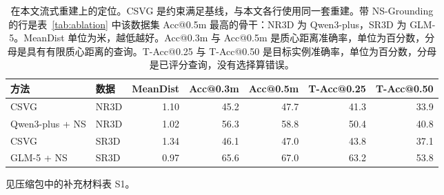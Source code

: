 \documentclass[11pt]{article}
\begin{document}
\begin{CJK*}{UTF8}{gbsn}
\begin{table}[ht]
\centering
\caption{在本文流式重建上的定位。CSVG 是约束满足基线，与本文各行使用同一套重建。带 NS-Grounding 的行是表~\ref{tab:ablation} 中该数据集 Acc@0.5m 最高的骨干：NR3D 为 Qwen3-plus，SR3D 为 GLM-5。MeanDist 单位为米，越低越好。Acc@0.3m 与 Acc@0.5m 是质心距离准确率，单位为百分数，分母是具有有限质心距离的查询。T-Acc@0.25 与 T-Acc@0.50 是目标实例准确率，单位为百分数，分母是已评分查询，没有选择算错误。}
\label{tab:csvg}
\small
\begin{tabular}{llrrrrr}
\toprule
方法 & 数据 & MeanDist & Acc@0.3m & Acc@0.5m & T-Acc@0.25 & T-Acc@0.50 \\
\midrule
CSVG & NR3D & 1.10 & 45.2 & 47.7 & 41.3 & 33.9 \\
Qwen3-plus + NS & NR3D & 1.02 & 56.3 & 58.8 & 50.4 & 40.8 \\
CSVG & SR3D & 1.34 & 46.1 & 47.0 & 43.8 & 37.1 \\
GLM-5 + NS & SR3D & 0.97 & 65.6 & 67.0 & 63.2 & 53.8 \\
\bottomrule
\end{tabular}
\end{table}

\noindent 见压缩包中的补充材料表 S1。

\begin{table}[ht]
\centering
\caption{更正后的定位消融。NS 表示 NS-Grounding；无 NS 时由语言模型直接选择实例。MeanDist、Acc@0.3m 与 Acc@0.5m 的定义同表~\ref{tab:csvg}。T-Acc@0.25 与 T-Acc@0.50 是两个 IoU 阈值下的目标实例准确率。GLM-5 在 SR3D 上、无 NS-Grounding 的一行为 51.9 / 52.5，因此 Acc@0.3m 不高于 Acc@0.5m。各数据集中最高的 Acc@0.5m 分别是 NR3D 上带 NS 的 Qwen3-plus（58.8）和 SR3D 上带 NS 的 GLM-5（67.0）。}
\label{tab:ablation}
\end{table}


\end{CJK*}
\end{document}
